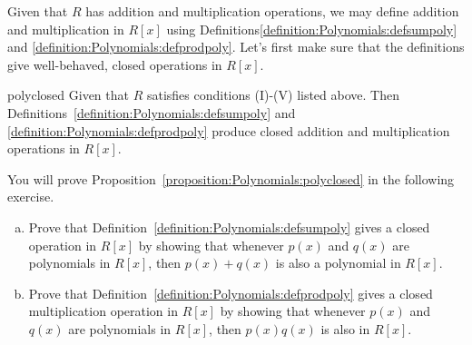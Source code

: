 %
%
%
%
%

Given that $R$ has addition and multiplication operations, we may define addition and multiplication in $R[x]$ using Definitions\ref{definition:Polynomials:defsumpoly} and \ref{definition:Polynomials:defprodpoly}. Let's first make sure that the definitions  give well-behaved, closed operations in $R[x]$. 

\begin{prop}{polyclosed} Given that $R$ satisfies conditions (I)-(V) listed above. Then Definitions~\ref{definition:Polynomials:defsumpoly} and \ref{definition:Polynomials:defprodpoly} produce  closed addition and multiplication operations in $R[x]$.
\end{prop}

You will prove Proposition~\ref{proposition:Polynomials:polyclosed} in the following exercise.

\begin{exercise}{}
\begin{enumerate}[(a)]
\item
Prove that Definition~\ref{definition:Polynomials:defsumpoly} gives a closed operation in $R[x]$ by showing that whenever $p(x)$ and $q(x)$ are polynomials in $R[x]$, then $p(x)+q(x)$ is also a polynomial in $R[x]$.
\item
Prove that Definition~\ref{definition:Polynomials:defprodpoly} gives a  closed multiplication operation in $R[x]$ by showing that whenever $p(x)$ and $q(x)$ are polynomials in $R[x]$, then $p(x)q(x)$ is also in $R[x]$.
\end{enumerate}
\end{exercise} 

